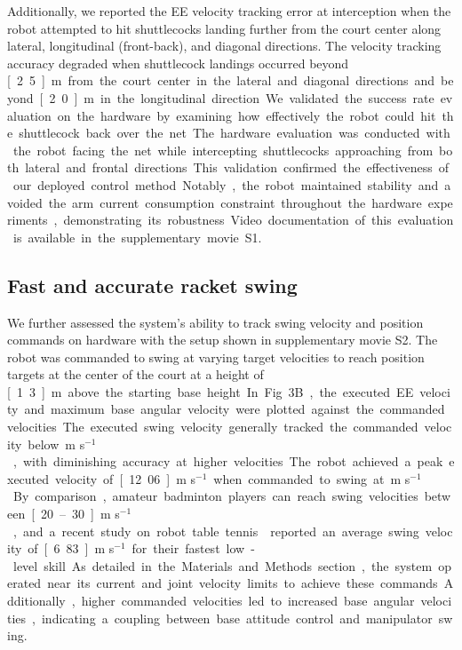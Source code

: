 \documentclass[9pt,twocolumn,twoside]{osajnl}
\begin{document}
Additionally, we reported the \ac{EE} velocity tracking error at interception when the robot attempted to hit shuttlecocks landing further from the court center along lateral, longitudinal (front-back), and diagonal directions. The velocity tracking accuracy degraded when shuttlecock landings occurred beyond \unit[2.5]{m} from the court center in the lateral and diagonal directions and beyond \unit[2.0]{m} in the longitudinal direction.

We validated the success rate evaluation on the hardware by examining how effectively the robot could hit the shuttlecock back over the net. The hardware evaluation was conducted with the robot facing the net while intercepting shuttlecocks approaching from both lateral and frontal directions. This validation confirmed the effectiveness of our deployed control method. Notably, the robot maintained stability and avoided the arm current consumption constraint throughout the hardware experiments, demonstrating its robustness. Video documentation of this evaluation is available in the supplementary movie S1.

\subsection*{Fast and accurate racket swing}
We further assessed the system's ability to track swing velocity and position commands on hardware with the setup shown in supplementary movie S2. The robot was commanded to swing at varying target velocities to reach position targets at the center of the court at a height of \unit[1.3]{m} above the starting base height. In Fig. 3B, the executed \ac{EE} velocity and maximum base angular velocity were plotted against the commanded velocities. The executed swing velocity generally tracked the commanded velocity below \unit[10]{m s$^{-1}$}, with diminishing accuracy at higher velocities. The robot achieved a peak executed velocity of \unit[12.06]{m s$^{-1}$} when commanded to swing at \unit[19]{m s$^{-1}$}. By comparison, amateur badminton players can reach swing velocities between \unit[20–30]{m s$^{-1}$}, and a recent study on robot table tennis \cite{d2024achieving} reported an average swing velocity of \unit[6.83]{m s$^{-1}$} for their fastest low-level skill. As detailed in the Materials and Methods section, the system operated near its current and joint velocity limits to achieve these commands. Additionally, higher commanded velocities led to increased base angular velocities, indicating a coupling between base attitude control and manipulator swing.
\end{document}
